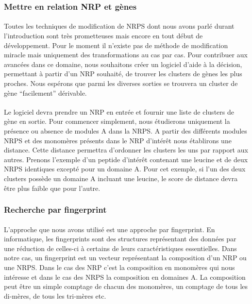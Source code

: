 \documentclass[12pt,french,twoside]{report}
\begin{document}
\subsubsection{Mettre en relation NRP et gènes}

\paragraph{}Toutes les techniques de modification de NRPS dont nous avons parlé durant l'introduction sont très prometteuses mais encore en tout début de développement.
Pour le moment il n'existe pas de méthode de modification miracle mais uniquement des transformations au cas par cas.
Pour contribuer aux avancées dans ce domaine, nous souhaitons créer un logiciel d'aide à la décision, permettant à partir d'un NRP souhaité, de trouver les clusters de gènes les plus proches.
Nous espérons que parmi les diverses sorties se trouvera un cluster de gène ``facilement'' dérivable.

\paragraph{}Le logiciel devra prendre un NRP en entrée et fournir une liste de clusters de gène en sortie.
Pour commencer simplement, nous étudierons uniquement la présence ou absence de modules A dans la NRPS.
A partir des différents modules NRPS et des monomères présents dans le NRP d'intérêt nous établirons une distance.
Cette distance permettra d'ordonner les clusters les uns par rapport aux autres.
Prenons l'exemple d'un peptide d'intérêt contenant une leucine et de deux NRPS identiques excepté pour un domaine A.
Pour cet exemple, si l'un des deux clusters possède un domaine A incluant une leucine, le score de distance devra être plus faible que pour l'autre.

\subsubsection{Recherche par fingerprint}

\paragraph{}L'approche que nous avons utilisé est une approche par fingerprint.
En informatique, les fingerprints sont des structures représentant des données par une réduction de celles-ci à certains de leurs caractéristiques essentielles.
Dans notre cas, un fingerprint est un vecteur représentant la composition d'un NRP ou une NRPS.
Dans le cas des NRP c'est la composition en monomères qui nous intéresse et dans le cas des NRPS la composition en domaines A.
La composition peut être un simple comptage de chacun des monomères, un comptage de tous les di-mères, de tous les tri-mères etc.
\end{document}
